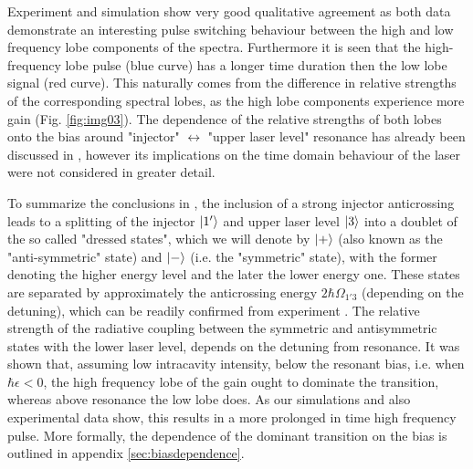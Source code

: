 \documentclass[10pt,letterpaper]{article}
\begin{document}
{Experiment and simulation show very good qualitative agreement as both data demonstrate an interesting pulse switching behaviour between the high and low frequency lobe components of the spectra. Furthermore it is seen that the high-frequency lobe pulse (blue curve) has a longer time duration then the low lobe signal (red curve). This naturally comes from the difference in relative strengths of the corresponding spectral lobes, as the high lobe components experience more gain (Fig. \ref{fig:img03}). The dependence of the relative strengths of both lobes onto the bias around "injector" $\leftrightarrow$ "upper laser level" resonance has already been discussed in \cite{dupont2010simplified}, however its implications on the time domain behaviour of the laser were not considered in greater detail. 


To summarize the conclusions in \cite{dupont2010simplified}, the inclusion of a strong injector anticrossing leads to a splitting of the injector $\Ket{1'}$ and upper laser level $\Ket{3}$ into a doublet of the so called "dressed states", which we will denote by $\Ket{+}$ (also known as the "anti-symmetric" state) and $\Ket{-}$ (i.e. the "symmetric" state), with the former denoting the higher energy level and the later the lower energy one. These states are separated by approximately the anticrossing energy $2\hbar\Omega_{1'3}$ (depending on the detuning), which can be readily confirmed from experiment \cite{burghoff2014terahertz}. The relative strength of the radiative coupling between the symmetric and antisymmetric states with the lower laser level, depends on the detuning from resonance. It was shown that, assuming low intracavity intensity, below the resonant bias, i.e. when $\hbar\epsilon <0$, the high frequency lobe of the gain ought to dominate the transition, whereas above resonance the low lobe does. As our simulations and also experimental data show, this results in a more prolonged in time high frequency pulse. More formally, the dependence of the dominant transition on the bias is outlined in appendix \ref{sec:biasdependence}. 

}
\end{document}
